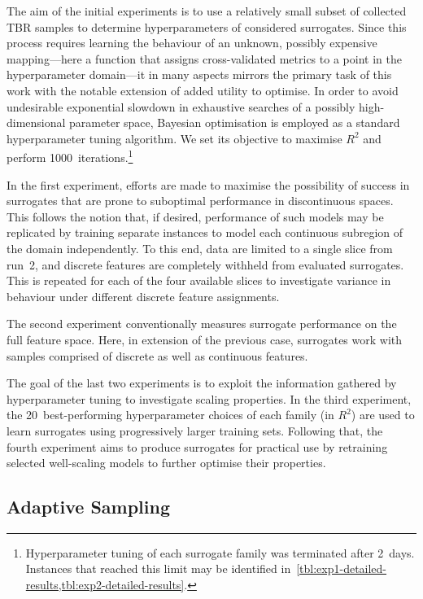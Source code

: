 The aim of the initial experiments is to use a relatively small subset of
collected TBR samples to determine hyperparameters of considered surrogates.
Since this process requires learning the behaviour of an unknown, possibly
expensive mapping---here a function that assigns cross-validated metrics to a
point in the hyperparameter domain---it in many aspects mirrors
the primary task of this work with the notable extension of added utility
to optimise. In order to avoid undesirable exponential slowdown in exhaustive
searches of a possibly high-dimensional parameter space, Bayesian
optimisation is employed as a standard hyperparameter tuning algorithm. We set
its objective to maximise $R^2$ and perform
1000~iterations.\footnote{Hyperparameter tuning of each surrogate family was
	terminated after 2~days. Instances that reached this limit may be identified
	in~\cref{tbl:exp1-detailed-results,tbl:exp2-detailed-results}.}

In the first experiment, efforts are made to maximise the possibility of success
in surrogates that are prone to suboptimal performance in discontinuous spaces.
This follows the notion that, if desired, performance of such models may be
replicated by training separate instances to model each continuous subregion of
the domain independently.
To this end, data are limited to a single slice from run~2, and discrete
features are completely withheld from evaluated
surrogates. This is repeated for each of the four available slices to
investigate variance in behaviour under different discrete feature assignments.

The second experiment conventionally measures surrogate performance on the full
feature space. Here, in extension of the previous case, surrogates work with
samples comprised of discrete as well as continuous features.

The goal of the last two experiments is to exploit the information gathered by
hyperparameter tuning to investigate scaling properties. In
the third experiment, the 20~best-performing hyperparameter choices of each family
(in $R^2$) are used to learn surrogates using progressively larger training sets. Following
that, the fourth experiment aims to produce surrogates for practical use by
retraining selected well-scaling models to further optimise their properties.


\subsection{Adaptive Sampling}
\label{sec:adaptive}

